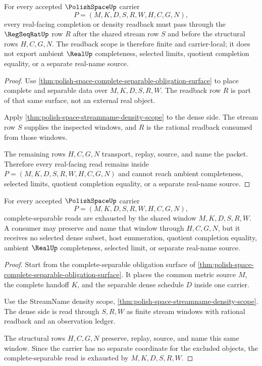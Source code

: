 \begin{theorem}
\label{thm:polish-space-regseqrat-real-readback-scope}
For every accepted $\PolishSpaceUp$ carrier
$$
P=(M,K,D,S,R,W,H,C,G,N),
$$
every real-facing completion or density readback must pass through the $\RegSeqRatUp$ row $R$ after the shared stream row $S$ and before the structural rows $H,C,G,N$. The readback scope is therefore finite and carrier-local; it does not export ambient $\RealUp$ completeness, selected limits, quotient completion equality, or a separate real-name source.
\end{theorem}
\begin{proof}
Use \autoref{thm:polish-space-complete-separable-obligation-surface} to place complete and separable data over $M,K,D,S,R,W$. The readback row $R$ is part of that same surface, not an external real object.

Apply \autoref{thm:polish-space-streamname-density-scope} to the dense side. The stream row $S$ supplies the inspected windows, and $R$ is the rational readback consumed from those windows.

The remaining rows $H,C,G,N$ transport, replay, source, and name the packet. Therefore every real-facing read remains inside $P=(M,K,D,S,R,W,H,C,G,N)$ and cannot reach ambient completeness, selected limits, quotient completion equality, or a separate real-name source.
\end{proof}

\begin{theorem}
\label{thm:polishspace-complete-separable-window-exhaustion}
For every accepted $\PolishSpaceUp$ carrier
$$
P=(M,K,D,S,R,W,H,C,G,N),
$$
complete-separable reads are exhausted by the shared window $M,K,D,S,R,W$. A consumer may preserve and name that window through $H,C,G,N$, but it receives no selected dense subset, host enumeration, quotient completion equality, ambient $\RealUp$ completeness, selected limit, or separate real-name source.
\end{theorem}
\begin{proof}
Start from the complete-separable obligation surface of \autoref{thm:polish-space-complete-separable-obligation-surface}. It places the common metric source $M$, the complete handoff $K$, and the separable dense schedule $D$ inside one carrier.

Use the StreamName density scope, \autoref{thm:polish-space-streamname-density-scope}. The dense side is read through $S,R,W$ as finite stream windows with rational readback and an observation ledger.

The structural rows $H,C,G,N$ preserve, replay, source, and name this same window. Since the carrier has no separate coordinate for the excluded objects, the complete-separable read is exhausted by $M,K,D,S,R,W$.
\end{proof}

